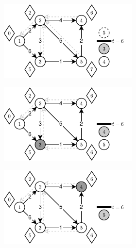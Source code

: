 \begin{figure}[!ht]
\begin{subfigure}[b]{\textwidth}
\begin{subfigure}[b]{0.32\textwidth}
			\caption{}
			\label{fig:exampleThreshold:c}
		\end{subfigure}
		\hfill\null
	\end{subfigure}
	\begin{subfigure}[b]{\textwidth}
		\null\hfill
		\begin{subfigure}[b]{0.32\textwidth}
			\includegraphics[width=\textwidth]{Chapter_III/THRESHOLD-Example/d.pdf}
			\caption{}
			\label{fig:exampleThreshold:d}
		\end{subfigure}
		\hfill
		\begin{subfigure}[b]{0.32\textwidth}
			\includegraphics[width=\textwidth]{Chapter_III/THRESHOLD-Example/e.pdf}
			\caption{}
			\label{fig:exampleThreshold:e}
		\end{subfigure}
		\hfill
		\begin{subfigure}[b]{0.32\textwidth}
			\includegraphics[width=\textwidth]{Chapter_III/THRESHOLD-Example/f.pdf}

\end{subfigure}
\end{subfigure}
\end{figure}
